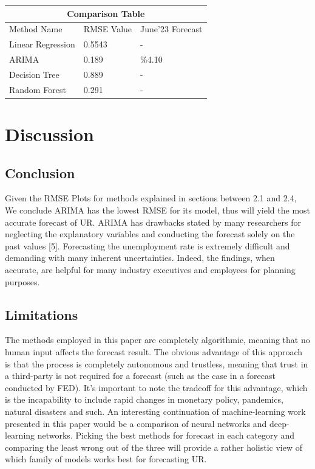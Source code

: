 \documentclass{article}
\begin{document}
\begin{center}
	\begin{tabular}{ |p{3cm}||p{3cm}||p{3cm}| }
		\hline
		\multicolumn{3}{|c|}{Comparison Table} \\
		\hline
		Method Name& RMSE Value &June'23 Forecast\\
		\hline
		Linear Regression  & 0.5543    &-\\
		ARIMA&   0.189  &  \%4.10 \\
		Decision Tree &0.889 & -\\
		Random Forest    &0.291 & -\\
		\hline
	\end{tabular}	
\end{center}


\section{Discussion}

	\subsection{Conclusion}
	Given the RMSE Plots for methods explained in sections between 2.1 and 2.4, We conclude ARIMA has the lowest RMSE for its model, thus will yield the most accurate forecast of UR. ARIMA has drawbacks stated by many researchers for neglecting the explanatory variables and conducting the forecast solely on the past values [5]. Forecasting the unemployment rate is extremely difficult and demanding with many inherent uncertainties. Indeed, the findings, when accurate, are helpful for many industry executives and employees for planning purposes. 
	
	\subsection{Limitations}
	The methods employed in this paper are completely algorithmic, meaning that no human input affects the forecast result. The obvious advantage of this approach is that the process is completely autonomous and trustless, meaning that trust in a third-party is not required for a forecast (such as the case in a forecast conducted by FED). It’s important to note the tradeoff for this advantage, which is the incapability to include rapid changes in monetary policy, pandemics, natural disasters and such.  An interesting continuation of machine-learning work presented in this paper would be a comparison of neural networks and deep-learning networks. Picking the best methods for forecast in each category and comparing the least wrong out of the three will provide a rather holistic view of which family of models works best for forecasting UR.
\end{document}
